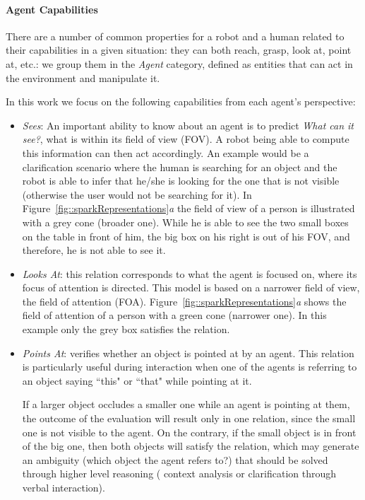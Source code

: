 \paragraph{Agent Capabilities}

There are a number of common properties for a robot and a human related to
their capabilities in a given situation: they can both reach, grasp, look at,
point at, etc.: we group them in the \emph{Agent} category, defined as entities
that can act in the environment and manipulate it.

In this work we focus on the following capabilities from each agent's
perspective:

\begin{itemize}

\item \emph{Sees}: An important ability to know about an agent is to predict
\emph{What can it see?}, \ie what is within its field of view (FOV). A robot being
able to compute this information can then act accordingly. An example would be
a clarification scenario where the human is searching for an object and the
robot is able to infer that he/she is looking for the one that is not visible
(otherwise the user would not be searching for it).  In
Figure~\ref{fig::sparkRepresentations}\emph{a} the field of view of a person is
illustrated with a grey cone (broader one). While he is able to see the two
small boxes on the table in front of him, the big box on his right is out of
his FOV, and therefore, he is not able to see it. 

\item \emph{Looks At}: this relation corresponds to what the agent is focused
on, \ie where its focus of attention is directed. This model is based on a
narrower field of view, the field of attention (FOA). 
Figure~\ref{fig::sparkRepresentations}\emph{a}
shows the field of attention of a person with a green cone (narrower one). In
this example only the grey box satisfies the  relation.

\item \emph{Points At}: verifies whether an object is pointed at by an agent.
This relation is particularly useful during interaction when one of the agents
is referring to an object saying ``this" or ``that" while pointing at it.
 
If a larger object occludes a smaller one while an agent is pointing at them, the
outcome of the evaluation will result only in one relation, \ie {} since the small one is not visible to the agent.  On the
contrary, if the small object is in front of the big one, then both objects
will satisfy the relation, which may generate an ambiguity (which object the
agent refers to?) that should be solved through higher level reasoning (\eg
context analysis or clarification through verbal interaction).


\end{itemize}
